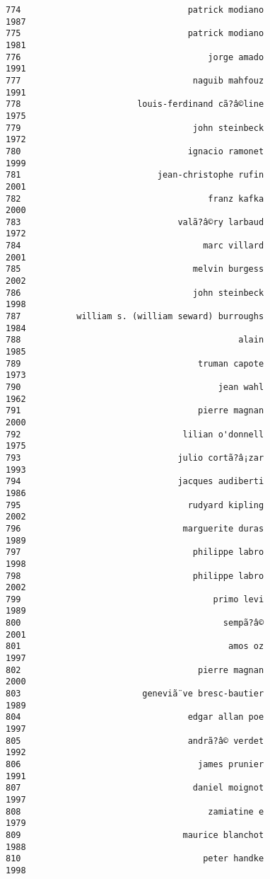 \documentclass[
]{report}
\begin{document}
\begin{verbatim}
774                                 patrick modiano                1987
775                                 patrick modiano                1981
776                                     jorge amado                1991
777                                  naguib mahfouz                1991
778                       louis-ferdinand cã?â©line                1975
779                                  john steinbeck                1972
780                                 ignacio ramonet                1999
781                           jean-christophe rufin                2001
782                                     franz kafka                2000
783                               valã?â©ry larbaud                1972
784                                    marc villard                2001
785                                  melvin burgess                2002
786                                  john steinbeck                1998
787           william s. (william seward) burroughs                1984
788                                           alain                1985
789                                   truman capote                1973
790                                       jean wahl                1962
791                                   pierre magnan                2000
792                                lilian o'donnell                1975
793                               julio cortã?â¡zar                1993
794                               jacques audiberti                1986
795                                 rudyard kipling                2002
796                                marguerite duras                1989
797                                  philippe labro                1998
798                                  philippe labro                2002
799                                      primo levi                1989
800                                        sempã?â©                2001
801                                         amos oz                1997
802                                   pierre magnan                2000
803                        geneviã¨ve bresc-bautier                1989
804                                 edgar allan poe                1997
805                                 andrã?â© verdet                1992
806                                   james prunier                1991
807                                  daniel moignot                1997
808                                     zamiatine e                1979
809                                maurice blanchot                1988
810                                    peter handke                1998

\end{verbatim}
\end{document}
